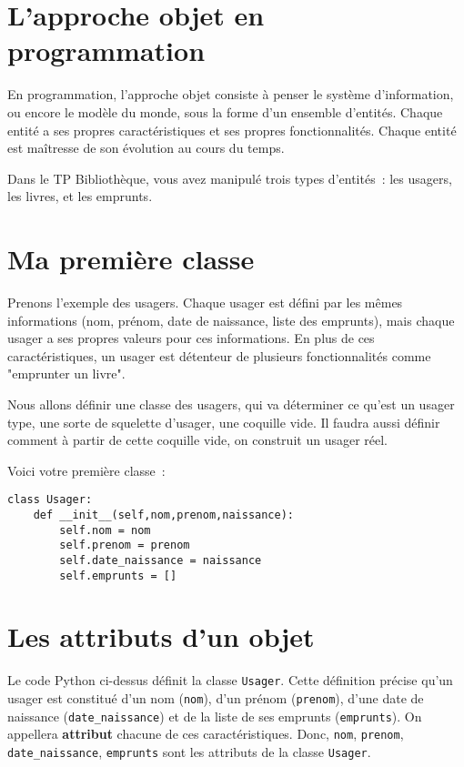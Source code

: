 \documentclass{article}
\begin{document}
\section{L'approche objet en programmation}

En programmation, l'approche objet consiste à penser le système d'information, ou encore le modèle du monde, sous la forme d'un ensemble d'entités. Chaque entité a ses propres caractéristiques et ses propres fonctionnalités. Chaque entité est maîtresse de son évolution au cours du temps.

Dans le TP Bibliothèque, vous avez manipulé trois types d'entités~: les usagers, les livres, et les emprunts.

\section{Ma première classe}

Prenons l'exemple des usagers. Chaque usager est défini par les mêmes informations (nom, prénom, date de naissance, liste des emprunts), mais chaque usager a ses propres valeurs pour ces informations. En  plus de ces caractéristiques, un usager est détenteur de plusieurs fonctionnalités comme "emprunter un livre".

Nous allons définir une classe des usagers, qui va déterminer ce qu'est un usager type, une sorte de squelette d'usager, une coquille vide. Il faudra aussi définir comment à partir de cette coquille vide, on construit un usager réel.

Voici votre première classe~:

\begin{verbatim}
class Usager:
    def __init__(self,nom,prenom,naissance):
        self.nom = nom
        self.prenom = prenom
        self.date_naissance = naissance
        self.emprunts = []

\end{verbatim}  

\section{Les attributs d'un objet}

Le code Python ci-dessus définit la classe \texttt{Usager}. Cette définition précise qu'un usager est constitué d'un nom (\texttt{nom}), d'un prénom (\texttt{prenom}), d'une date de naissance (\texttt{date\_naissance}) et de la liste de ses emprunts (\texttt{emprunts}). On appellera \textbf{attribut} chacune de ces caractéristiques. Donc, \texttt{nom}, \texttt{prenom}, \texttt{date\_naissance}, \texttt{emprunts} sont les attributs de la classe \texttt{Usager}.
\end{document}
